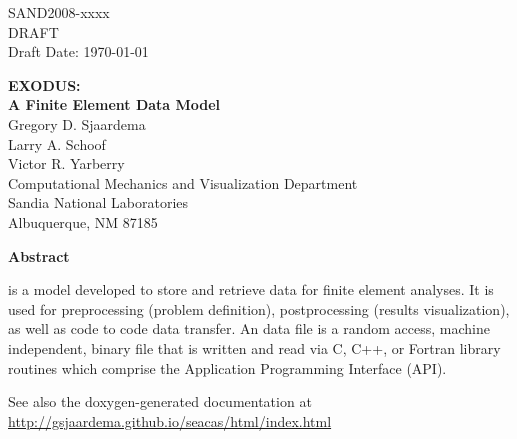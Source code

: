 \begin{titlepage}
\begin{center}
SAND2008-xxxx\\
DRAFT\\
Draft Date: \today\\
\end{center}

\vspace{1.0in}

\begin{center}
{\Huge\bf EXODUS:\\ A Finite Element Data Model\\}
\vspace{1.0in}
{\large Gregory D. Sjaardema\\
	Larry A. Schoof\\
	Victor R. Yarberry\\
	Computational Mechanics and Visualization Department\\
	Sandia National Laboratories\\
	Albuquerque, NM 87185}
\end{center}
\vspace{1.0in}
\begin{center}
\large\bf Abstract
\end{center}

\exo{} is a model developed to store and retrieve data for finite
element analyses. It is used for preprocessing (problem definition),
postprocessing (results visualization), as well as code to code data
transfer. An \exo{} data file is a random access, machine independent,
binary file that is written and read via C, C++, or Fortran library
routines which comprise the Application Programming Interface (API).

See also the doxygen-generated documentation at \url{http://gsjaardema.github.io/seacas/html/index.html}

\end{titlepage}
